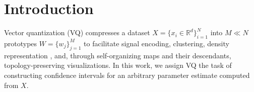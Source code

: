 \documentclass[runningheads]{llncs}
\begin{document}
\begin{abstract}
\end{abstract}


\section{Introduction}\label{sec:intro}

Vector quantization (VQ) compresses a dataset $X = \{x_i \in \mathbb{R}^d\}_{i=1}^N$ into $M \ll N$ prototypes $W = \{w_j\}_{j=1}^M$ to facilitate signal encoding, clustering, density representation \cite{graf2000}, and, through self-organizing maps and their descendants, topology-preserving visualizations. In this work, we assign VQ the task of constructing confidence intervals for an arbitrary parameter estimate  computed from $X$.
\end{document}
